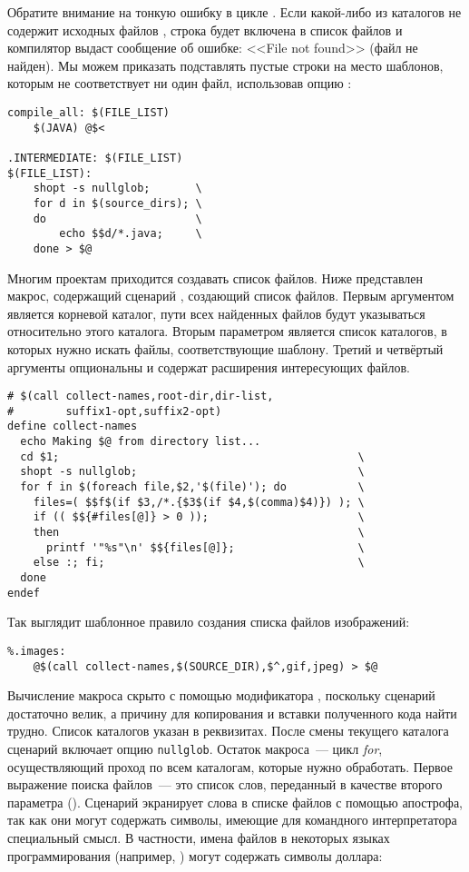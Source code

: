 Обратите внимание на тонкую ошибку в цикле . Если
какой-либо из каталогов не содержит исходных файлов \Java{}, строка
 будет включена в список файлов и компилятор \Java{}
выдаст сообщение об ошибке: <<File not found>> (файл не найден). Мы
можем приказать  подставлять пустые строки на место
шаблонов, которым не соответствует ни один файл, использовав опцию
:

{\footnotesize
\begin{verbatim}
compile_all: $(FILE_LIST)
    $(JAVA) @$<

.INTERMEDIATE: $(FILE_LIST)
$(FILE_LIST):
    shopt -s nullglob;       \
    for d in $(source_dirs); \
    do                       \
        echo $$d/*.java;     \
    done > $@
\end{verbatim}
}

Многим проектам приходится создавать список файлов. Ниже представлен
макрос, содержащий сценарий , создающий список файлов.
Первым аргументом является корневой каталог, пути всех найденных
файлов будут указываться относительно этого каталога. Вторым
параметром является список каталогов, в которых нужно искать файлы,
соответствующие шаблону. Третий и четвёртый аргументы опциональны и
содержат расширения интересующих файлов.

{\footnotesize
\begin{verbatim}
# $(call collect-names,root-dir,dir-list,
#        suffix1-opt,suffix2-opt)
define collect-names
  echo Making $@ from directory list...             
  cd $1;                                              \
  shopt -s nullglob;                                  \
  for f in $(foreach file,$2,'$(file)'); do           \
    files=( $$f$(if $3,/*.{$3$(if $4,$(comma)$4)}) ); \
    if (( $${#files[@]} > 0 ));                       \
    then                                              \
      printf '"%s"\n' $${files[@]};                   \
    else :; fi;                                       \
  done
endef
\end{verbatim}
}

Так выглядит шаблонное правило создания списка файлов изображений:

{\footnotesize
\begin{verbatim}
%.images:
    @$(call collect-names,$(SOURCE_DIR),$^,gif,jpeg) > $@
\end{verbatim}
}

Вычисление макроса скрыто с помощью модификатора ,
поскольку сценарий достаточно велик, а причину для копирования и
вставки полученного кода найти трудно. Список каталогов указан в
реквизитах. После смены текущего каталога сценарий включает опцию
\texttt{nullglob}. Остаток макроса~--- цикл \emph{for}, осуществляющий
проход по всем каталогам, которые нужно обработать. Первое выражение
поиска файлов~--- это список слов, переданный в качестве второго
параметра (\variable{\${}2}). Сценарий экранирует слова в списке
файлов с помощью апострофа, так как они могут содержать символы,
имеющие для командного интерпретатора специальный смысл. В частности,
имена файлов в некоторых языках программирования (например, \Java{})
могут содержать символы доллара:

